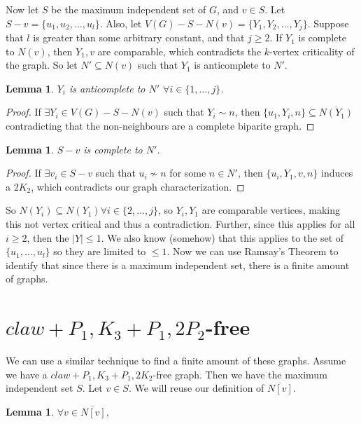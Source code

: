 \documentclass[11pt]{article}
\newtheorem{lemma}[theorem]{Lemma}
\theoremstyle{definition}
\newcommand{\noneighbs}{\overline{N[v]}}
\begin{document}
Now let $S$ be the maximum independent set of $G$, and $v \in S$. Let $S - v = \{u_1, u_2, \dots, u_l \}$. Also, let $V(G) - S - N(v) = \{Y_1, Y_2, \dots, Y_j\}$. Suppose that $l$ is greater than some arbitrary constant, and that $j \geq 2$. If $Y_1$ is complete to $N(v)$, then $Y_1, v$ are comparable, which contradicts the $k$-vertex criticality of the graph. So let $N' \subseteq N(v)$ such that $Y_1$ is anticomplete to $N'$.

\begin{lemma}\label{lem:anticomplete}
$Y_i$ is anticomplete to $N'$ $\forall i \in \{1, \dots, j\}$.
\end{lemma}
\begin{proof}
If $\exists Y_i \in V(G) - S - N(v)$ such that $Y_i \sim n$, then $\{ u_1, Y_i, n \} \subseteq \overline{N(Y_1)}$ contradicting that the non-neighbours are a complete biparite graph. 
\end{proof}

\begin{lemma}\label{lem:ScompleteNprime}
$S- v$ is complete to $N'$.
\end{lemma}
\begin{proof}
If $\exists v_i \in S - v$ such that $u_i \not \sim n$ for some $n \in N'$, then $\{ u_i, Y_1, v, n \}$ induces a $2K_2$, which contradicts our graph characterization.
\end{proof}

So $N(Y_i) \subseteq N(Y_1) \forall i \in \{2, \dots, j\}$, so $Y_i, Y_1$ are comparable vertices, making this not vertex critical and thus a contradiction. Further, since this applies for all $i \geq 2$, then the $|Y| \leq 1$. We also know (somehow) that this applies to the set of $\{u_1, \dots, u_l \}$ so they are limited to $\leq 1$.
Now we can use Ramsay's Theorem to identify that since there is a maximum independent set, there is a finite amount of graphs.

\section{$claw + P_1, K_3 + P_1, 2P_2$-free}
We can use a similar technique to find a finite amount of these graphs. Assume we have a $claw + P_1, K_3 + P_1, 2K_2$-free graph. Then we have the maximum independent set $S$. Let $v \in S$. We will reuse our definition of $\noneighbs$.
\begin{lemma}\label{lem:clawminset}
$\forall v \in \noneighbs, $
\end{lemma}
\end{document}
